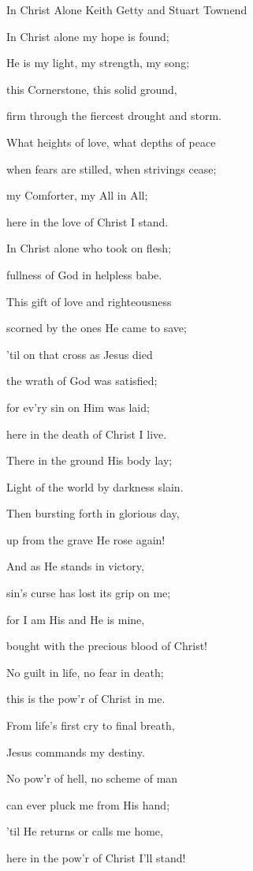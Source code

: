 \documentclass[12pt]{book}
\begin{document}
\begin{song}{In Christ Alone}{}
  {}
  {Keith Getty and Stuart Townend}
  {}
  {}

  \begin{SBVerse}
    In Christ alone my hope is found;

    He is my light, my strength, my song;

    this Cornerstone, this solid ground,

    firm through the fiercest drought and storm.

    What heights of love, what depths of peace

    when fears are stilled, when strivings cease;

    my Comforter, my All in All;

    here in the love of Christ I stand.
  \end{SBVerse}

  \begin{SBVerse}
    In Christ alone who took on flesh;

    fullness of God in helpless babe.

    This gift of love and righteousness

    scorned by the ones He came to save;

    'til on that cross as Jesus died

    the wrath of God was satisfied;

    for ev'ry sin on Him was laid;

    here in the death of Christ I live.
  \end{SBVerse}

  \begin{SBVerse}
    There in the ground His body lay;

    Light of the world by darkness slain.

    Then bursting forth in glorious day,

    up from the grave He rose again!

    And as He stands in victory,

    sin's curse has lost its grip on me;

    for I am His and He is mine,

    bought with the precious blood of Christ!
  \end{SBVerse}

  \begin{SBVerse}
    No guilt in life, no fear in death;

    this is the pow'r of Christ in me.

    From life's first cry to final breath,

    Jesus commands my destiny.

    No pow'r of hell, no scheme of man

    can ever pluck me from His hand;

    'til He returns or calls me home,

    here in the pow'r of Christ I'll stand!
  \end{SBVerse}
\end{song}
\end{document}
